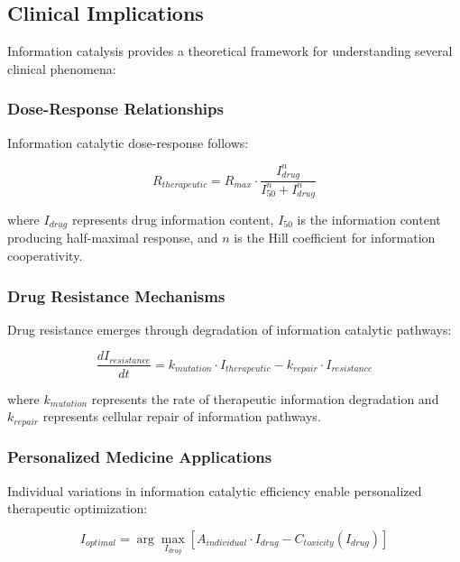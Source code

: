 \documentclass[12pt,a4paper]{article}
\begin{document}
\subsection{Clinical Implications}

Information catalysis provides a theoretical framework for understanding several clinical phenomena:

\subsubsection{Dose-Response Relationships}

Information catalytic dose-response follows:

\begin{equation}
R_{therapeutic} = R_{max} \cdot \frac{I_{drug}^n}{I_{50}^n + I_{drug}^n}
\end{equation}

where $I_{drug}$ represents drug information content, $I_{50}$ is the information content producing half-maximal response, and $n$ is the Hill coefficient for information cooperativity.

\subsubsection{Drug Resistance Mechanisms}

Drug resistance emerges through degradation of information catalytic pathways:

\begin{equation}
\frac{dI_{resistance}}{dt} = k_{mutation} \cdot I_{therapeutic} - k_{repair} \cdot I_{resistance}
\end{equation}

where $k_{mutation}$ represents the rate of therapeutic information degradation and $k_{repair}$ represents cellular repair of information pathways.

\subsubsection{Personalized Medicine Applications}

Individual variations in information catalytic efficiency enable personalized therapeutic optimization:

\begin{equation}
I_{optimal} = \arg\max_{I_{drug}} \left[ A_{individual} \cdot I_{drug} - C_{toxicity}(I_{drug}) \right]
\end{equation}
\end{document}
